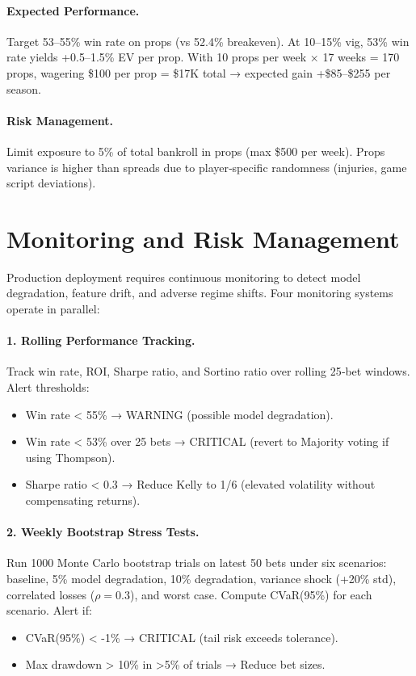 \paragraph{Expected Performance.}
Target 53--55\% win rate on props (vs 52.4\% breakeven). At 10--15\% vig, 53\% win rate yields +0.5--1.5\% EV per prop. With 10 props per week × 17 weeks = 170 props, wagering \$100 per prop = \$17K total → expected gain +\$85--\$255 per season.

\paragraph{Risk Management.}
Limit exposure to 5\% of total bankroll in props (max \$500 per week). Props variance is higher than spreads due to player‑specific randomness (injuries, game script deviations).

\section{Monitoring and Risk Management}
\label{sec:monitoring}

Production deployment requires continuous monitoring to detect model degradation, feature drift, and adverse regime shifts. Four monitoring systems operate in parallel:

\paragraph{1. Rolling Performance Tracking.}
Track win rate, ROI, Sharpe ratio, and Sortino ratio over rolling 25‑bet windows. Alert thresholds:
\begin{itemize}
\item Win rate < 55\% → WARNING (possible model degradation).
\item Win rate < 53\% over 25 bets → CRITICAL (revert to Majority voting if using Thompson).
\item Sharpe ratio < 0.3 → Reduce Kelly to 1/6 (elevated volatility without compensating returns).
\end{itemize}

\paragraph{2. Weekly Bootstrap Stress Tests.}
Run 1000 Monte Carlo bootstrap trials on latest 50 bets under six scenarios: baseline, 5\% model degradation, 10\% degradation, variance shock (+20\% std), correlated losses ($\rho=0.3$), and worst case. Compute CVaR(95\%) for each scenario. Alert if:
\begin{itemize}
\item CVaR(95\%) < -1\% → CRITICAL (tail risk exceeds tolerance).
\item Max drawdown > 10\% in >5\% of trials → Reduce bet sizes.
\end{itemize}

